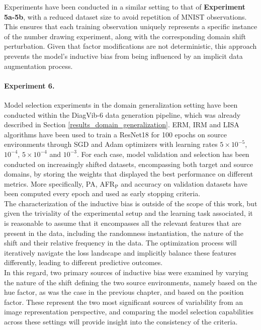 Experiments have been conducted in a similar setting to that of \textbf{Experiment 5a-5b}, 
with a reduced dataset size to avoid repetition of MNIST 
observations. This ensures that each training observation uniquely represents a specific instance 
of the number drawing experiment, along with the corresponding domain 
shift perturbation. Given that factor modifications are not deterministic, this approach prevents the model's inductive bias 
from being influenced by an implicit data augmentation process.

\paragraph{Experiment 6.} Model selection experiments in the domain generalization setting 
have been conducted within the DiagVib-6 \cite{euligDiagViB6DiagnosticBenchmark2021}
data generation pipeline, which
was already described in Section \ref{results_domain_generalization}. ERM, 
IRM \cite{arjovskyInvariantRiskMinimization2020}
and
LISA \cite{yaoImprovingOutofDistributionRobustness2022}
algorithms have been used to train a ResNet18 for 100 epochs on source environments through
SGD \cite{ruderOverviewGradientDescent2017} 
and Adam \cite{kingmaAdamMethodStochastic2017}
optimizers with learning rates $5 \times 10^{-5}$,  $10^{-4}$, $5 \times 10^{-4}$ and $10^{-3}$. 
For each case, model validation and selection has been conducted on increasingly
shifted datasets, encompassing both target and source domains, by storing the weights
that displayed the best performance on different metrics. More specifically, 
PA, AFR$_{\text{P}}$ and accuracy on validation datasets have been computed every epoch
and used as early stopping criteria. \\

The characterization of the inductive bias is outside of the scope of this work, but given the
triviality of the experimental setup and the learning task associated, it is reasonable to assume 
that it encompasses all the relevant features that are present in the data,
including the randomness instantiation, the nature of the shift and their relative frequency in the
data. The optimization process will iteratively navigate the loss landscape and implicitly
balance these features differently, leading to different predictive outcomes.  \\

In this regard, two primary sources of inductive bias were examined by varying the nature of the
shift defining the two source environments, namely based on the hue factor, as was the case in the
previous chapter, and based on the position factor. These represent the two most significant 
sources of variability from an image representation perspective, and comparing the model selection 
capabilities across these settings will provide insight into the consistency of the criteria. \\

